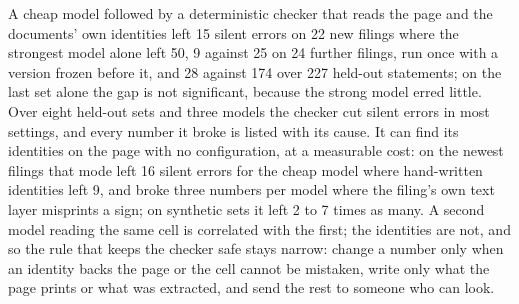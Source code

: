 \documentclass[10pt,twocolumn]{article}
\begin{document}
A cheap model followed by a deterministic checker that reads the page and the documents' own identities left 15 silent errors on 22 new filings where the strongest model alone left 50, 9 against 25 on 24 further filings, run once with a version frozen before it, and 28 against 174 over 227 held-out statements; on the last set alone the gap is not significant, because the strong model erred little. Over eight held-out sets and three models the checker cut silent errors in most settings, and every number it broke is listed with its cause. It can find its identities on the page with no configuration, at a measurable cost: on the newest filings that mode left 16 silent errors for the cheap model where hand-written identities left 9, and broke three numbers per model where the filing's own text layer misprints a sign; on synthetic sets it left 2 to 7 times as many. A second model reading the same cell is correlated with the first; the identities are not, and so the rule that keeps the checker safe stays narrow: change a number only when an identity backs the page or the cell cannot be mistaken, write only what the page prints or what was extracted, and send the rest to someone who can look.

{\footnotesize


}


\end{document}
